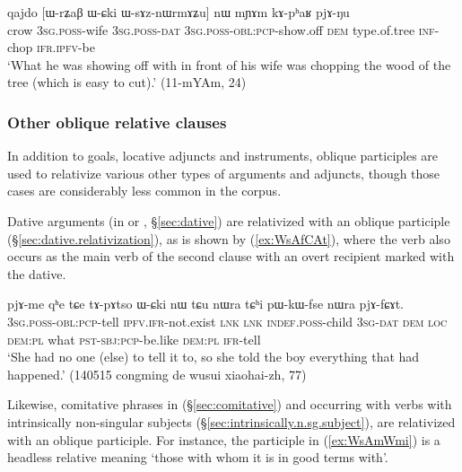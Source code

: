 \begin{exe}
\ex \label{ex:WsAznWrmAZu}
\gll qajdo [ɯ-rʑaβ ɯ-ɕki ɯ-sɤz-nɯrmɤʑu] nɯ mɲɤm kɤ-pʰaʁ pjɤ-ŋu  \\
crow \textsc{3sg}.\textsc{poss}-wife \textsc{3sg}.\textsc{poss}-\textsc{dat} \textsc{3sg}.\textsc{poss}-\textsc{obl}:\textsc{pcp}-show.off \textsc{dem} type.of.tree \textsc{inf}-chop \textsc{ifr}.\textsc{ipfv}-be \\
\glt  `What he was showing off with in front of his wife was chopping the wood of the  tree (which is easy to cut).' (11-mYAm, 24)
\end{exe}

\subsubsection{Other oblique relative clauses} \label{sec:other.oblique.participle.relatives}
In addition to goals, locative adjuncts and instruments, oblique participles are used to relativize various other types of arguments and adjuncts, though those cases are considerably less common in the corpus.

Dative arguments (in  or , §\ref{sec:dative}) are relativized with an oblique participle (§\ref{sec:dative.relativization}), as is shown by (\ref{ex:WsAfCAt}),  where the verb  also occurs as the main verb of the second clause with an overt recipient marked with the dative.

\begin{exe}
\ex \label{ex:WsAfCAt}
\gll [ɯ-sɤ-fɕɤt] pjɤ-me qʰe tɕe tɤ-pɤtso ɯ-ɕki nɯ tɕu nɯra tɕʰi pɯ-kɯ-fse nɯra pjɤ-fɕɤt. \\
\textsc{3sg}.\textsc{poss}-\textsc{obl}:\textsc{pcp}-tell \textsc{ipfv}.\textsc{ifr}-not.exist \textsc{lnk} \textsc{lnk} \textsc{indef}.\textsc{poss}-child \textsc{3sg}-\textsc{dat} \textsc{dem} \textsc{loc} \textsc{dem}:\textsc{pl} what \textsc{pst}-\textsc{sbj}:\textsc{pcp}-be.like  \textsc{dem}:\textsc{pl} \textsc{ifr}-tell \\
\glt `She had no one (else) to tell it to, so she told the boy everything that had happened.' (140515 congming de wusui xiaohai-zh, 77)
\end{exe} 

Likewise, comitative phrases in  (§\ref{sec:comitative}) and occurring with verbs with intrinsically non-singular subjects (§\ref{sec:intrinsically.n.sg.subject}), are relativized with an oblique participle. For instance, the participle  in (\ref{ex:WsAmWmi}) is a headless relative meaning `those with whom it is in good terms with'.

